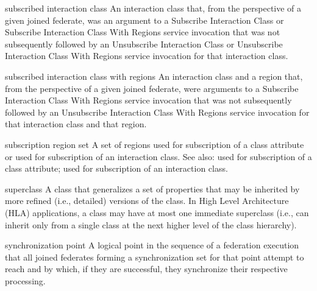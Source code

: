 
\begin{definition}{subscribed interaction class}
    An interaction class that, from the perspective of a given joined federate, was an argument to a Subscribe Interaction Class or Subscribe Interaction Class With Regions service invocation that was not subsequently followed by an Unsubscribe Interaction Class or Unsubscribe Interaction Class With Regions service invocation for that interaction class.
\end{definition}


\begin{definition}{subscribed interaction class with regions}
    An interaction class and a region that, from the perspective of a given joined federate, were arguments to a Subscribe Interaction Class With Regions service invocation that was not subsequently followed by an Unsubscribe Interaction Class With Regions service invocation for that interaction class and that region.
\end{definition}


\begin{definition}{subscription region set}
    A set of regions used for subscription of a class attribute or used for subscription of an interaction class. See also: used for subscription of a class attribute; used for subscription of an interaction class.
\end{definition}

\begin{definition}{superclass}
    A class that generalizes a set of properties that may be inherited by more refined (i.e., detailed) versions of the class. In High Level Architecture (HLA) applications, a class may have at most one immediate superclass (i.e., can inherit only from a single class at the next higher level of the class hierarchy).
\end{definition}

\begin{definition}{synchronization point}
    A logical point in the sequence of a federation execution that all joined federates forming a synchronization set for that point attempt to reach and by which, if they are successful, they synchronize their respective processing.
\end{definition}

